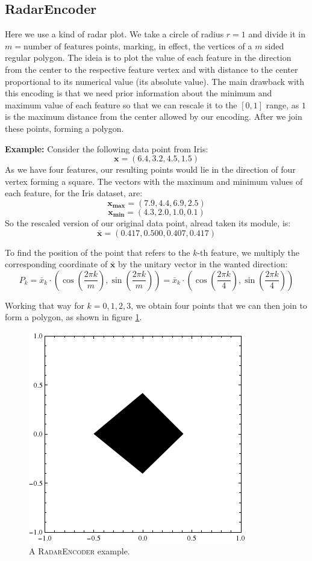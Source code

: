 \documentclass[11pt]{article}
\begin{document}
\subsection{RadarEncoder}

Here we use a kind of radar plot. We take a circle of radius $r = 1$ and divide it in $m = \text{number of features}$ points, marking, in effect, the vertices of a $m$ sided regular polygon. The ideia is to plot the value of each feature in the direction from the center to the respective feature vertex and with distance to the center proportional to its numerical value (its absolute value). The main drawback with this encoding is that we need prior information about the minimum and maximum value of each feature so that we can rescale it to the $[0,1]$ range, as $1$ is the maximum distance from the center allowed by our encoding. After we join these points, forming a polygon.


\textbf{Example:} Consider the following data point from Iris:
\[
\mathbf{x} = (6.4,3.2,4.5,1.5)
\]
As we have four features, our resulting points would lie in the direction of four vertex forming a square. The vectors with the maximum and minimum values of each feature, for the Iris dataset, are:
\[
\mathbf{x_{max}} = (7.9, 4.4, 6.9, 2.5)
\]
\[
\mathbf{x_{min}} = (4.3, 2.0, 1.0, 0.1)
\]
So the rescaled version of our original data point, alread taken its module, is:
\[
\bar{\mathbf{x}} = (0.417, 0.500, 0.407, 0.417)
\]

To find the position of the point that refers to the $k$-th feature, we multiply the corresponding coordinate of $\bar{\mathbf{x}}$ by the unitary vector in the wanted direction:
\[
P_k = \bar{x}_k \cdot \left( \cos \left( \frac{2\pi k}{m} \right), \sin \left( \frac{2\pi k}{m} \right) \right ) = \bar{x}_k \cdot \left( \cos \left( \frac{2\pi k}{4} \right), \sin \left( \frac{2\pi k}{4} \right ) \right )
\] 

Working that way for $k = 0,1,2,3$, we obtain four points that we can then join to form a polygon, as shown in figure \ref{fig:R}.

\begin{figure}[htp]
\centering
\includegraphics[scale=0.65]{radarGraph.png}
\caption{A \textsc{RadarEncoder} example.}
\label{fig:R}
\end{figure}
\end{document}
